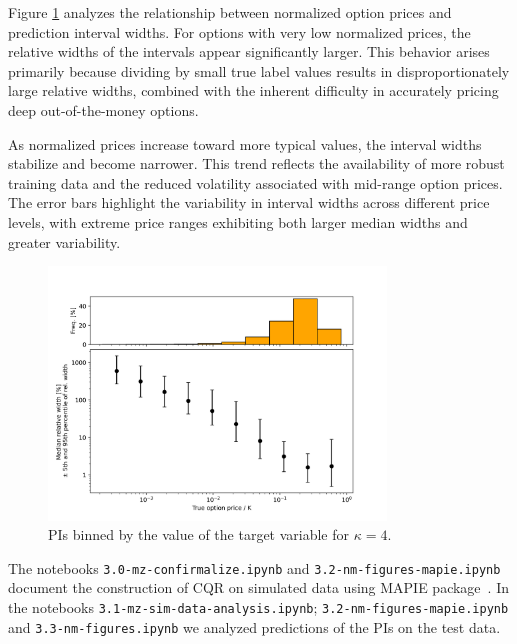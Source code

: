 \documentclass{article}
\theoremstyle{definition}
\begin{document}
Figure \ref{fig:kappa4_rel_widths_vs_option_price} analyzes the relationship between normalized option prices and prediction interval widths. For options with very low normalized prices, the relative widths of the intervals appear significantly larger. This behavior arises primarily because dividing by small true label values results in disproportionately large relative widths, combined with the inherent difficulty in accurately pricing deep out-of-the-money options.

As normalized prices increase toward more typical values, the interval widths stabilize and become narrower. This trend reflects the availability of more robust training data and the reduced volatility associated with mid-range option prices. The error bars highlight the variability in interval widths across different price levels, with extreme price ranges exhibiting both larger median widths and greater variability.

\begin{figure}[H]
\centering
\includegraphics[width=0.8\textwidth]{reports/figures/simulated_data/sim_kappa4_rel_widths_to_opt_price.png}
\caption{PIs binned by the value of the target variable for $\kappa=4$.}
\label{fig:kappa4_rel_widths_vs_option_price}
\end{figure}

The notebooks \texttt{3.0-mz-confirmalize.ipynb} and \texttt{3.2-nm-figures-mapie.ipynb} document the construction of CQR on simulated data using MAPIE package~\cite{Cordier_Flexible_and_Systematic_2023}. In the notebooks \texttt{3.1-mz-sim-data-analy\allowbreak sis.ipynb}; \texttt{3.2-nm-figures-mapie.ipynb} and 
\texttt{3.3-nm-figures.ipynb} we analyzed predictions of the PIs on the test data. 
\end{document}
